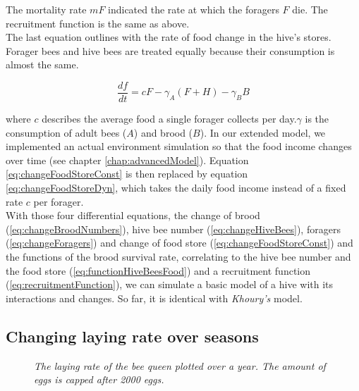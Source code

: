 	The mortality rate $mF$ indicated the rate at which the foragers $F$ die. The recruitment function is the same as above.\\	
	The last equation outlines with the rate of food change in the hive's stores. Forager bees and hive bees are treated equally because their consumption is almost the same. 
	
	\begin{equation}\label{eq:changeFoodStoreConst}
		\frac{df}{dt} = c F - \gamma_A (F+H) - \gamma_B B
	\end{equation}
	
	where $c$ describes the average food a single forager collects per day.$\gamma$ is the consumption of adult bees ($A$) and brood ($B$). In our extended model, we implemented an actual environment simulation so that the food income changes over time (see chapter \ref{chap:advancedModel}). Equation \ref{eq:changeFoodStoreConst} is then replaced by equation \ref{eq:changeFoodStoreDyn}, which takes the daily food income instead of a fixed rate $c$ per forager.\\
	
	With those four differential equations, the change of brood (\ref{eq:changeBroodNumbers}), hive bee number (\ref{eq:changeHiveBees}), foragers (\ref{eq:changeForagers}) and change of food store (\ref{eq:changeFoodStoreConst}) and the functions of the brood survival rate, correlating to the hive bee number and the food store (\ref{eq:functionHiveBeesFood}) and a recruitment function (\ref{eq:recruitmentFunction}), we can simulate a basic model of a hive with its interactions and changes. So far, it is identical with \textit{Khoury's} model.

	\subsection{Changing laying rate over seasons}
		\begin{figure}[H]
			\centering
			\caption{\textit{The laying rate of the bee queen plotted over a year. The amount of eggs is capped after 2000 eggs. }}
			\label{fig:dynLayingRate}
		\end{figure}
		
